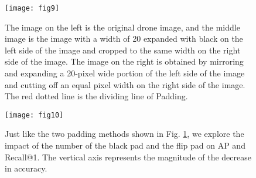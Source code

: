 \documentclass[lettersize,journal]{IEEEtran}
\begin{document}
\begin{table}[h]
\renewcommand\arraystretch{1.5}
\caption{In the two cases of Black Pad and Flip Pad, the proposed FSRA and State-Of-The-Art method LPN correspond to the AP accuracy values of different pad sizes and the speed of decline.}
\label{table4}
\end{table}

\begin{figure}[!t]
\centering
\texttt{[image: fig9]}
\caption{The image on the left is the original drone image, and the middle image is the image with a width of 20 expanded with black on the left side of the image and cropped to the same width on the right side of the image. The image on the right is obtained by mirroring and expanding a 20-pixel wide portion of the left side of the image and cutting off an equal pixel width on the right side of the image. The red dotted line is the dividing line of Padding. }
\label{fig_9}
\end{figure}

\begin{figure}[!t]
\centering
\texttt{[image: fig10]}
\caption{Just like the two padding methods shown in Fig. \ref{fig_9}, we explore the impact of the number of the black pad and the flip pad on AP and Recall@1. The vertical axis represents the magnitude of the decrease in accuracy.}
\label{fig_10}
\end{figure}
\end{document}
